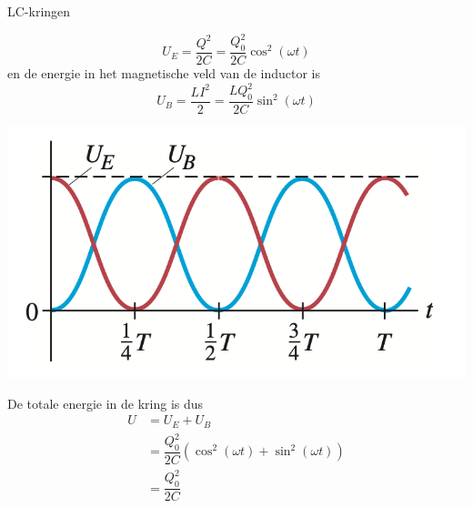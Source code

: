 \begin{app}[LC-kringen]{LC-kringen}
    \begin{minipage}{.70\textwidth}
        \begin{equation*}
            U_{E} = \dfrac{Q^{2}}{2C} = \dfrac{Q_{0}^2}{2C}\cos^2(\omega t)
        \end{equation*}
        \hspace{-0.6cm} en de energie in het magnetische veld van de inductor is 
        \begin{equation*}
            U_{B} = \dfrac{LI^{2}}{2} = \dfrac{LQ_{0}^2}{2C}\sin^2(\omega t)
        \end{equation*}
    \end{minipage}
    \begin{minipage}{.26\textwidth}
        \vspace{0cm}\hspace{-1.4cm}\includegraphics[scale = 0.4]{Images/Magnetisme/LCKringOscillatie.png} 
    \end{minipage}
    De totale energie in de kring is dus
    \begin{align*}
        U &= U_{E} + U_{B} \\
          &= \dfrac{Q_{0}^2}{2C}\left(\cos^2(\omega t) +\sin^2(\omega t)\right) \\ 
          &= \dfrac{Q_{0}^2}{2C}
    \end{align*}
\end{app}

\newpage

